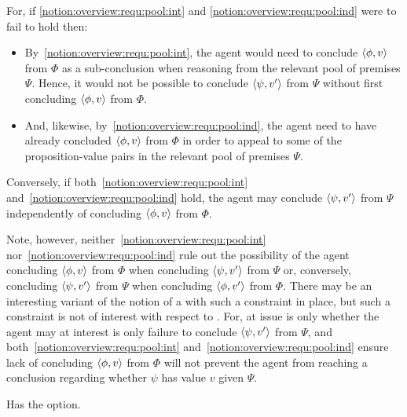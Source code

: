 \begin{note}
    For, if \ref{notion:overview:requ:pool:int} and \ref{notion:overview:requ:pool:ind} were to fail to hold then:
  \begin{itemize}
  \item
    By~\ref{notion:overview:requ:pool:int}, the agent would need to conclude \(\langle \phi, v \rangle\) from \(\Phi\) as a sub-conclusion when reasoning from the relevant pool of premises \(\Psi\).
    Hence, it would not be possible to conclude \(\langle \psi, v' \rangle\) from \(\Psi\) without first concluding \(\langle \phi, v \rangle\) from \(\Phi\).
  \item
    And, likewise, by~\ref{notion:overview:requ:pool:ind}, the agent need to have already concluded \(\langle \phi, v \rangle\) from \(\Phi\) in order to appeal to some of the proposition-value pairs in the relevant pool of premises \(\Psi\).
  \end{itemize}

  Conversely, if both~\ref{notion:overview:requ:pool:int} and~\ref{notion:overview:requ:pool:ind} hold, the agent may conclude \(\langle \psi, v' \rangle\) from \(\Psi\) independently of concluding \(\langle \phi, v \rangle\) from \(\Phi\).

  Note, however, neither~\ref{notion:overview:requ:pool:int} nor~\ref{notion:overview:requ:pool:ind} rule out the possibility of the agent concluding \(\langle \phi, v \rangle\) from \(\Phi\) when concluding \(\langle \psi, v' \rangle\) from \(\Psi\) or, conversely, concluding \(\langle \psi, v' \rangle\) from \(\Psi\) when concluding \(\langle \phi, v' \rangle\) from \(\Phi\).
  There may be an interesting variant of the notion of a \requ{} with such a constraint in place, but such a constraint is not of interest with respect to \qzS{}.
  For, at issue is only whether the agent may at interest is only failure to conclude \(\langle \psi, v' \rangle\) from \(\Psi\), and both~\ref{notion:overview:requ:pool:int} and~\ref{notion:overview:requ:pool:ind} ensure lack of concluding \(\langle \phi, v \rangle\) from \(\Phi\) will not prevent the agent from reaching a conclusion regarding whether \(\psi\) has value \(v\) given \(\Psi\).
\end{note}

\begin{note}
  \color{red}
  Has the option.
\end{note}

